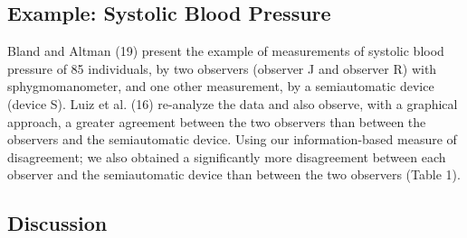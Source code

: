 \documentclass[MAIN.tex]{subfiles}
\begin{document}
	
	
	\subsection{Example: Systolic Blood Pressure}
	Bland and Altman (19) present the example of measurements of systolic blood pressure of 85 individuals, by two observers (observer J and observer R) with sphygmomanometer, and one other measurement, by a semiautomatic device (device S). Luiz et al. (16) re-analyze the data and also observe, with a graphical approach, a greater agreement between the two observers than between the observers and the semiautomatic device. Using our information-based measure of disagreement; we also obtained a significantly more
	disagreement between each observer and the semiautomatic device than between the two observers (Table 1).
	
	
	\subsection{Discussion}
	
\end{document}
